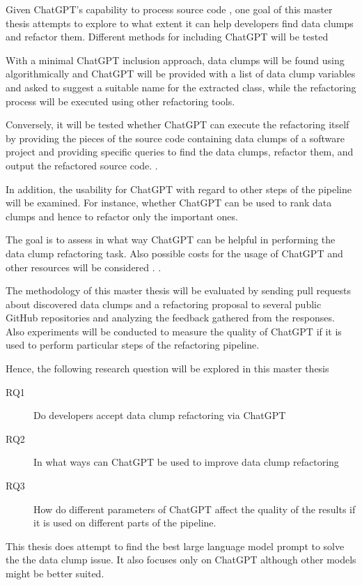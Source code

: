 Given ChatGPT's capability to process  source code \cite{sadik2023analysis}\cite{guo2023exploring}, one goal of this master thesis attempts to explore to what extent it can help developers find data clumps and refactor them. Different methods for including ChatGPT will be tested  

With a minimal ChatGPT inclusion approach,  data clumps will be found using algorithmically  and ChatGPT will be provided with a list of data clump variables and asked to suggest a suitable name for the extracted class, while the refactoring process will be executed using other refactoring tools.


Conversely, it will be tested whether ChatGPT can execute the refactoring itself by providing the pieces of the source code containing data clumps of a software project and providing specific queries to find the data clumps, refactor them, and output the refactored source code. \cite{White2023ChatGPTPP}.

In addition, the usability for ChatGPT with regard to other steps of the pipeline will be examined. For instance, whether ChatGPT can be used to rank data clumps and hence to refactor only the important ones. 

The goal is to assess in what way ChatGPT can be helpful in performing the data clump refactoring task. Also possible costs for the usage of ChatGPT and other resources will be considered \cite{xia2023conversation}. \cite{4ef0b456377aafb68884e643779dffb36b8e7cc1}.


The methodology of this master thesis will be evaluated by sending  pull requests about discovered data clumps and a refactoring proposal to several public GitHub repositories and analyzing the feedback gathered from the responses. Also experiments will be conducted to measure the quality of ChatGPT if it is used to perform particular steps of the refactoring pipeline.  

Hence, the following research question will be explored in this master thesis

\begin{description}
    \item [RQ1] Do developers accept data clump refactoring via ChatGPT
    \item [RQ2] In what ways can ChatGPT be used to improve data clump refactoring
    \item [RQ3] How do different parameters of ChatGPT affect the quality of the results if it is used on different parts of the pipeline. 
\end{description}
This thesis does attempt to find the best large language model prompt to solve the the data clump issue. It also focuses only on ChatGPT although other models might be better suited. 
